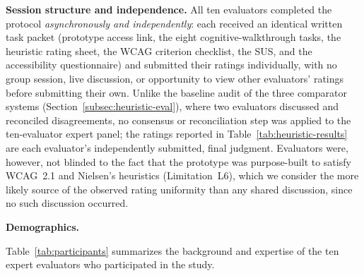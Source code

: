 \documentclass[journal,onecolumn]{IEEEtran}
\begin{document}
\textbf{Session structure and independence.} All ten evaluators completed the protocol \emph{asynchronously and independently}: each received an identical written task packet (prototype access link, the eight cognitive-walkthrough tasks, the heuristic rating sheet, the WCAG criterion checklist, the SUS, and the accessibility questionnaire) and submitted their ratings individually, with no group session, live discussion, or opportunity to view other evaluators' ratings before submitting their own. Unlike the baseline audit of the three comparator systems (Section~\ref{subsec:heuristic-eval}), where two evaluators discussed and reconciled disagreements, no consensus or reconciliation step was applied to the ten-evaluator expert panel; the ratings reported in Table~\ref{tab:heuristic-results} are each evaluator's independently submitted, final judgment. Evaluators were, however, not blinded to the fact that the prototype was purpose-built to satisfy WCAG~2.1 and Nielsen's heuristics (Limitation~L6), which we consider the more likely source of the observed rating uniformity than any shared discussion, since no such discussion occurred.

\noindent\textbf{Demographics.}

Table~\ref{tab:participants} summarizes the background and expertise of
the ten expert evaluators who participated in the study.
\end{document}
